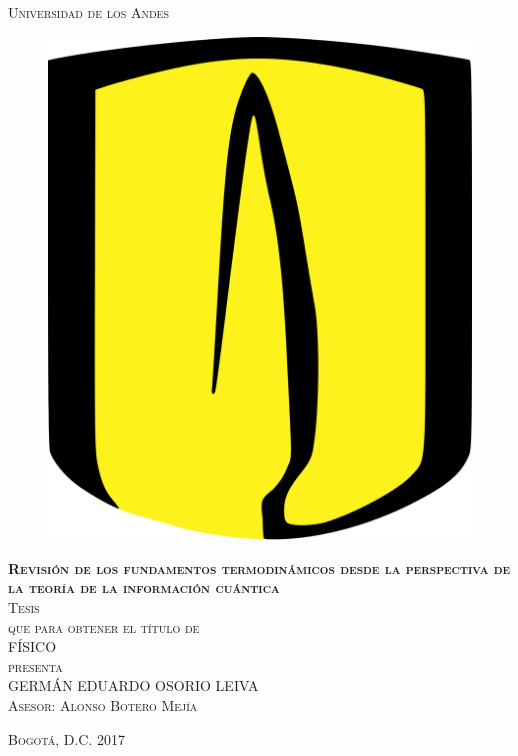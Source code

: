 \documentclass[11pt]{book}
\begin{document}
\begin{titlepage}
\begin{center}

\textsc{\Large Universidad de los Andes}\\[4em]

\begin{figure}[h]
\begin{center}
\includegraphics[scale=0.045]{ellogo.png}
\end{center}
\end{figure}

\vspace{4em}

\textsc{\huge \textbf{Revisión de los fundamentos termodinámicos desde la perspectiva de la teoría de la información cuántica}}\\[4em]

\textsc{\large Tesis}\\[1em]

\textsc{que para obtener el título de}\\[1em]

\textsc{FÍSICO}\\[1em]

\textsc{presenta}\\[1em]

\textsc{\Large 	GERMÁN EDUARDO OSORIO LEIVA}\\[1em]

\textsc{\large Asesor: Alonso Botero Mejía}

\end{center}

\vspace*{\fill}
\textsc{Bogotá, D.C. \hspace*{\fill} 2017}

\end{titlepage}
\end{document}
